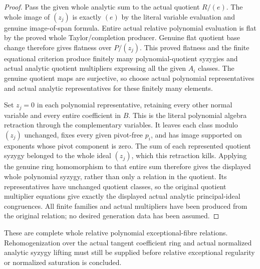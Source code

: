 \begin{proof}
Pass the given whole analytic sum to the actual quotient $R/(e)$.
The whole image of $(z_j)$ is exactly $(e)$ by the literal variable
evaluation and genuine image-of-span formula. Entire actual relative
polynomial evaluation is flat by the proved whole Taylor/completion
producer. Genuine flat quotient base change therefore gives flatness
over $P/(z_j)$. This proved flatness and the finite equational
criterion produce finitely many polynomial-quotient syzygies and
actual analytic quotient multipliers expressing all the given $A_i$
classes. The genuine quotient maps are surjective, so choose actual
polynomial representatives and actual analytic representatives for
these finitely many elements.

Set $z_j=0$ in each polynomial representative, retaining every other
normal variable and every entire coefficient in $B$. This is the
literal polynomial algebra retraction through the complementary
variables. It leaves each class modulo $(z_j)$ unchanged, fixes every
given pivot-free $p_i$, and has image supported on exponents whose
pivot component is zero. The sum of each represented quotient syzygy
belonged to the whole ideal $(z_j)$, which this retraction kills.
Applying the genuine ring homomorphism to that entire sum therefore
gives the displayed whole polynomial syzygy, rather than only a
relation in the quotient. Its representatives have unchanged quotient
classes, so the original quotient multiplier equations give exactly
the displayed actual analytic principal-ideal congruences. All finite
families and actual multipliers have been produced from the original
relation; no desired generation data has been assumed.
\end{proof}

These are complete whole relative polynomial exceptional-fibre relations.
Rehomogenization over the actual tangent coefficient ring and actual
normalized analytic syzygy lifting must still be supplied before relative
exceptional regularity or normalized saturation is concluded.
